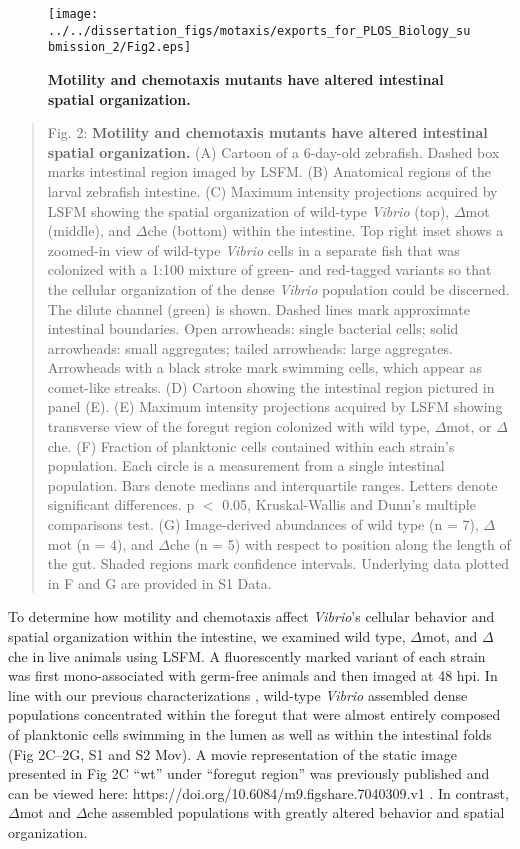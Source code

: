 \begin{figure}[h!]
	\centerline{
		\texttt{[image: ../../dissertation\_figs/motaxis/exports\_for\_PLOS\_Biology\_submission\_2/Fig2.eps]}}
	\caption{\textbf{Motility and chemotaxis mutants have altered intestinal spatial organization.}}
\end{figure}

\begin{quote}
Fig. 2: \textbf{Motility and chemotaxis mutants have altered intestinal spatial organization.} (A) Cartoon of a 6-day-old zebrafish. Dashed box marks intestinal region imaged by LSFM. (B) Anatomical regions of the larval zebrafish intestine. (C) Maximum intensity projections acquired by LSFM showing the spatial organization of wild-type \textit{Vibrio} (top), $\Delta$mot (middle), and $\Delta$che (bottom) within the intestine. Top right inset shows a zoomed-in view of wild-type \textit{Vibrio} cells in a separate fish that was colonized with a 1:100 mixture of green- and red-tagged variants so that the cellular organization of the dense \textit{Vibrio} population could be discerned. The dilute channel (green) is shown. Dashed lines mark approximate intestinal boundaries. Open arrowheads: single bacterial cells; solid arrowheads: small aggregates; tailed arrowheads: large aggregates. Arrowheads with a black stroke mark swimming cells, which appear as comet-like streaks. (D) Cartoon showing the intestinal region pictured in panel (E). (E) Maximum intensity projections acquired by LSFM showing transverse view of the foregut region colonized with wild type, $\Delta$mot, or $\Delta$che. (F) Fraction of planktonic cells contained within each strain's population. Each circle is a measurement from a single intestinal population. Bars denote medians and interquartile ranges. Letters denote significant differences. p $ < $ 0.05, Kruskal-Wallis and Dunn's multiple comparisons test. (G) Image-derived abundances of wild type (n = 7), $\Delta$mot (n = 4), and $\Delta$che (n = 5) with respect to position along the length of the gut. Shaded regions mark confidence intervals. Underlying data plotted in F and G are provided in S1 Data.
\end{quote}

To determine how motility and chemotaxis affect \textit{Vibrio}'s cellular behavior and spatial organization within the intestine, we examined wild type, $\Delta$mot, and $\Delta$che in live animals using LSFM. A fluorescently marked variant of each strain was first mono-associated with germ-free animals and then imaged at 48 hpi. In line with our previous characterizations \cite{wiles_modernized_2018,schlomann_bacterial_2018}, wild-type \textit{Vibrio} assembled dense populations concentrated within the foregut that were almost entirely composed of planktonic cells swimming in the lumen as well as within the intestinal folds (Fig 2C–2G, S1 and S2 Mov). A movie representation of the static image presented in Fig 2C ``wt'' under ``foregut region'' was previously published and can be viewed here: https://doi.org/10.6084/m9.figshare.7040309.v1 \cite{wiles_modernized_2018}. In contrast, $\Delta$mot and $\Delta$che assembled populations with greatly altered behavior and spatial organization. 

